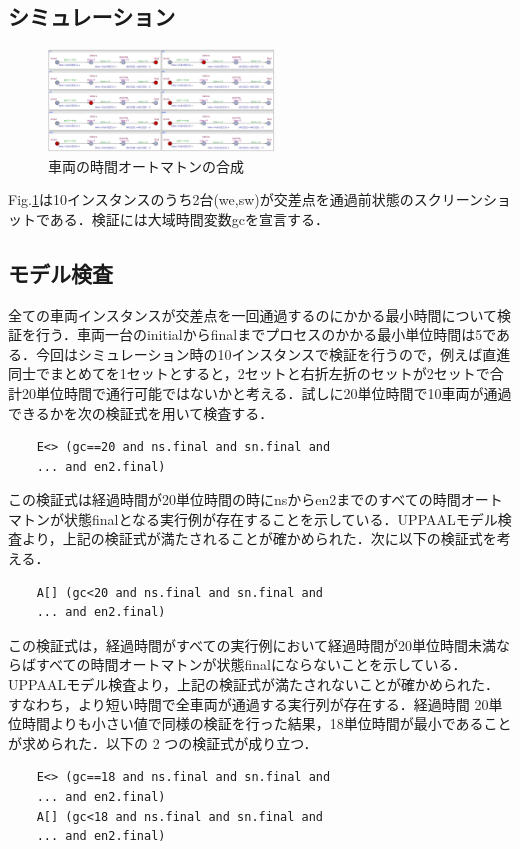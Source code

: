 \documentclass{jarticle}
\begin{document}
\subsection{シミュレーション}
	\begin{figure}[htbp]
	\centering
	\includegraphics[width=60mm]{dArr.png}
	\caption{車両の時間オートマトンの合成}
	\label{dArr}
	\end{figure}
Fig.\ref{dArr}は10インスタンスのうち2台(we,sw)が交差点を通過前状態のスクリーンショットである．検証には大域時間変数gcを宣言する．
\subsection{モデル検査}
全ての車両インスタンスが交差点を一回通過するのにかかる最小時間について検証を行う．車両一台のinitialからfinalまでプロセスのかかる最小単位時間は5である．今回はシミュレーション時の10インスタンスで検証を行うので，例えば直進同士でまとめてを1セットとすると，2セットと右折左折のセットが2セットで合計20単位時間で通行可能ではないかと考える．試しに20単位時間で10車両が通過できるかを次の検証式を用いて検査する．
	
	\begin{verbatim}
	E<> (gc==20 and ns.final and sn.final and 
	... and en2.final)	
	\end{verbatim}
この検証式は経過時間が20単位時間の時にnsからen2までのすべての時間オートマトンが状態finalとなる実行例が存在することを示している．UPPAALモデル検査より，上記の検証式が満たされることが確かめられた．次に以下の検証式を考える．

	\begin{verbatim}
	A[] (gc<20 and ns.final and sn.final and 
	... and en2.final)	
	\end{verbatim}

この検証式は，経過時間がすべての実行例において経過時間が20単位時間未満ならばすべての時間オートマトンが状態finalにならないことを示している．UPPAALモデル検査より，上記の検証式が満たされないことが確かめられた．すなわち，より短い時間で全車両が通過する実行列が存在する．経過時間 20単位時間よりも小さい値で同様の検証を行った結果，18単位時間が最小であることが求められた．以下の 2 つの検証式が成り立つ．
	\begin{verbatim}
	E<> (gc==18 and ns.final and sn.final and 
	... and en2.final)	
	A[] (gc<18 and ns.final and sn.final and 
	... and en2.final)	
	\end{verbatim}
\end{document}
